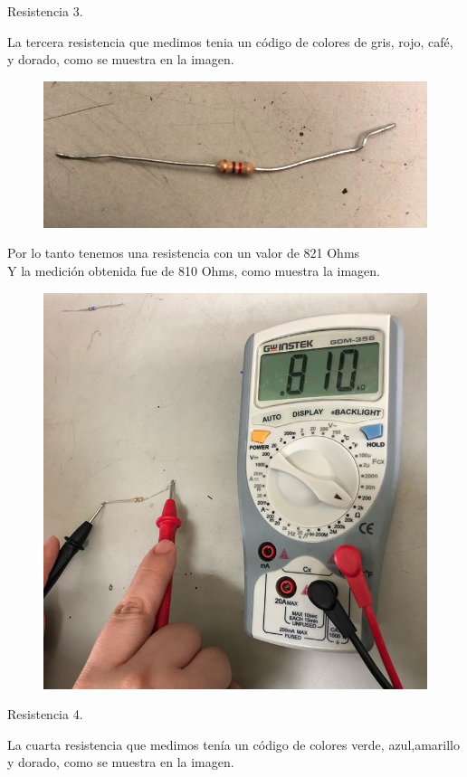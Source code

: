 \documentclass[11pt,a4paper]{report}
\begin{document}
\begin{flushleft}
	\begin{large}
		\vspace*{2cm}
		Resistencia 3.\\
	\end{large}
	La tercera resistencia que medimos tenia un c\'odigo de colores de gris, rojo, caf\'e, y dorado, como se muestra en la imagen.\\
	
	\begin{figure}[H]
		\centering
		\includegraphics[width=0.4\linewidth]{resistencia3}
		\label{fig:resistencia3}
	\end{figure}
	\newpage
	\vspace*{2cm}
	Por lo tanto tenemos una resistencia con un valor de 821 Ohms \\
	Y la medici\'on obtenida fue de 810 Ohms, como muestra la imagen.\\
	\begin{figure}[H]
		\centering
		\includegraphics[width=0.3\linewidth]{medicion3}
		\label{fig:medicion3}
	\end{figure}
	
	\begin{large}
		\vspace*{2cm}
		Resistencia 4.\\
	\end{large}
	La cuarta resistencia que medimos ten\'ia un c\'odigo de colores verde, azul,amarillo y dorado, como se muestra en la imagen.\\
	

\end{flushleft}
\end{document}
